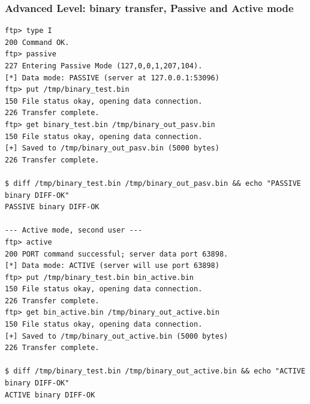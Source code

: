 \documentclass[11pt]{article}
\begin{document}
\subsubsection{Advanced Level: binary transfer, Passive and Active mode}
\begin{lstlisting}
ftp> type I
200 Command OK.
ftp> passive
227 Entering Passive Mode (127,0,0,1,207,104).
[*] Data mode: PASSIVE (server at 127.0.0.1:53096)
ftp> put /tmp/binary_test.bin
150 File status okay, opening data connection.
226 Transfer complete.
ftp> get binary_test.bin /tmp/binary_out_pasv.bin
150 File status okay, opening data connection.
[+] Saved to /tmp/binary_out_pasv.bin (5000 bytes)
226 Transfer complete.

$ diff /tmp/binary_test.bin /tmp/binary_out_pasv.bin && echo "PASSIVE binary DIFF-OK"
PASSIVE binary DIFF-OK

--- Active mode, second user ---
ftp> active
200 PORT command successful; server data port 63898.
[*] Data mode: ACTIVE (server will use port 63898)
ftp> put /tmp/binary_test.bin bin_active.bin
150 File status okay, opening data connection.
226 Transfer complete.
ftp> get bin_active.bin /tmp/binary_out_active.bin
150 File status okay, opening data connection.
[+] Saved to /tmp/binary_out_active.bin (5000 bytes)
226 Transfer complete.

$ diff /tmp/binary_test.bin /tmp/binary_out_active.bin && echo "ACTIVE binary DIFF-OK"
ACTIVE binary DIFF-OK
\end{lstlisting}
\end{document}
